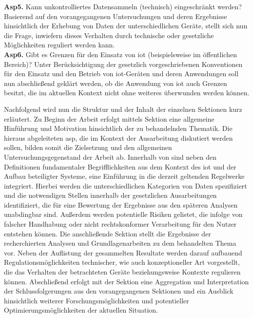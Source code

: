 \textbf{Asp5.} Kann unkontrolliertes Datensammeln (technisch) eingeschränkt werden? Basierend auf den vorangegangenen Untersuchungen und deren Ergebnisse hinsichtlich der Erhebung von Daten der unterschiedlichen Geräte, stellt sich nun die Frage, inwiefern dieses Verhalten durch technische oder gesetzliche Möglichkeiten reguliert werden kann.\\
\textbf{Asp6.} Gibt es Grenzen für den Einsatz von \ac{iot} (beispielsweise im öffentlichen Bereich)? Unter Berücksichtigung der gesetzlich vorgeschriebenen Konventionen für den Einsatz und den Betrieb von \ac{iot}-Geräten und deren Anwendungen soll nun abschließend geklärt werden, ob die Anwendung von \ac{iot} auch Grenzen besitzt, die im aktuellen Kontext nicht ohne weiteres überwunden werden können.


\noindent Nachfolgend wird nun die Struktur und der Inhalt der einzelnen Sektionen kurz erläutert. 
Zu Beginn der Arbeit erfolgt mittels Sektion  eine allgemeine Hinführung und Motivation hinsichtlich der zu behandelnden Thematik. Die hieraus abgeleiteten \ac{asp}, die im Kontext der Ausarbeitung diskutiert werden sollen, bilden somit die Zielsetzung und den allgemeinen Untersuchungsgegenstand der Arbeit ab. 
Innerhalb von  sind neben den Definitionen fundamentaler Begrifflichkeiten aus dem Kontext des \ac{iot} und der Aufbau beteiligter Systeme, eine Einführung in die derzeit geltenden Regelwerke integriert. 
Hierbei werden die unterschiedlichen Kategorien von Daten spezifiziert und die notwendigen Stellen innerhalb der gesetzlichen Ausarbeitungen identifiziert, die für eine Bewertung der Ergebnisse aus den späteren Analysen unabdingbar sind. 
Außerdem werden potentielle Risiken gelistet, die infolge von falscher Handhabung oder nicht rechtskonformer Verarbeitung für den Nutzer entstehen können. Die anschließende Sektion  stellt die Ergebnisse der recherchierten Analysen und Grundlagenarbeiten zu dem behandelten Thema vor. 
Neben der Auflistung der gesammelten Resultate werden darauf aufbauend Regulationsmöglichkeiten technischer, wie auch konzeptioneller Art vorgestellt, die das Verhalten der betrachteten Geräte beziehungsweise Kontexte regulieren können. 
Abschließend erfolgt mit der Sektion  eine Aggregation und Interpretation der Schlussfolgerungen aus den vorangegangenen Sektionen und ein Ausblick hinsichtlich weiterer Forschungsmöglichkeiten und potentieller Optimierungsmöglichkeiten der aktuellen Situation. 

